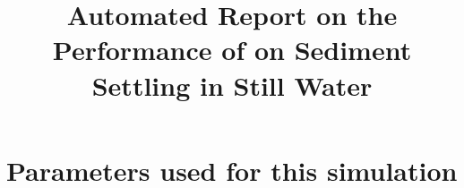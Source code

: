 \documentclass[11pt,a4paper]{article}%
\begin{document}
 

\title{Automated Report on the Performance of \anuga{} on Sediment Settling in Still Water}
\maketitle




\section{Parameters used for this simulation}






\end{document}
